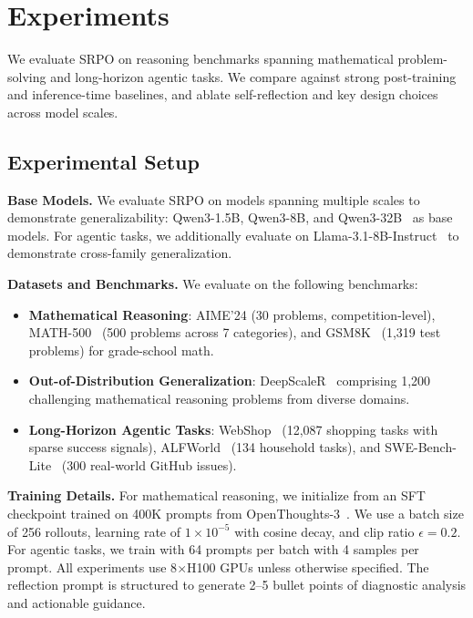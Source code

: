 \documentclass{article}
\newcommand{\method}{SRPO}
\theoremstyle{plain}
\theoremstyle{definition}
\theoremstyle{remark}
\begin{document}
\section{Experiments}
\label{experiments}

We evaluate \method{} on reasoning benchmarks spanning mathematical problem-solving and long-horizon agentic tasks.
We compare against strong post-training and inference-time baselines, and ablate self-reflection and key design choices across model scales.

\subsection{Experimental Setup}

\textbf{Base Models.}
We evaluate \method{} on models spanning multiple scales to demonstrate generalizability:
Qwen3-1.5B, Qwen3-8B, and Qwen3-32B~\cite{qwen3} as base models.
For agentic tasks, we additionally evaluate on Llama-3.1-8B-Instruct~\cite{llama3herdmodels} to demonstrate cross-family generalization.

\textbf{Datasets and Benchmarks.}
We evaluate on the following benchmarks:
\begin{itemize}
    \item \textbf{Mathematical Reasoning}: AIME'24 (30 problems, competition-level), MATH-500~\cite{lightman2024lets} (500 problems across 7 categories), and GSM8K~\cite{gsm8k} (1,319 test problems) for grade-school math.
    \item \textbf{Out-of-Distribution Generalization}: DeepScaleR~\cite{deepscaler2025} comprising 1,200 challenging mathematical reasoning problems from diverse domains.
    \item \textbf{Long-Horizon Agentic Tasks}: WebShop~\cite{yao2023webshop} (12,087 shopping tasks with sparse success signals), ALFWorld~\cite{shridhar2021alfworld} (134 household tasks), and SWE-Bench-Lite~\cite{jimenez2024swebench} (300 real-world GitHub issues).
\end{itemize}

\textbf{Training Details.}
For mathematical reasoning, we initialize from an SFT checkpoint trained on 400K prompts from OpenThoughts-3~\cite{openthoughts3}.
We use a batch size of 256 rollouts, learning rate of $1\times10^{-5}$ with cosine decay, and clip ratio $\epsilon=0.2$.
For agentic tasks, we train with 64 prompts per batch with 4 samples per prompt.
All experiments use 8$\times$H100 GPUs unless otherwise specified.
The reflection prompt is structured to generate 2--5 bullet points of diagnostic analysis and actionable guidance.
\end{document}
